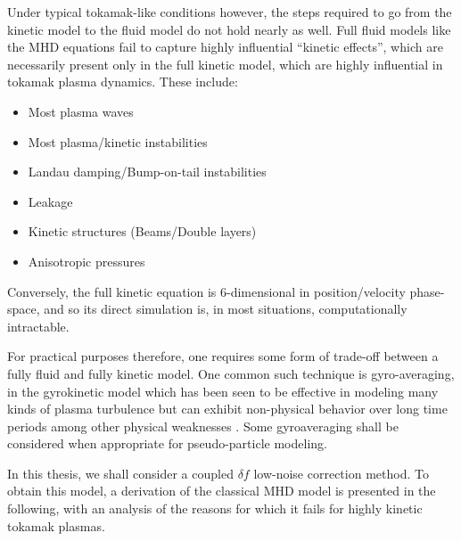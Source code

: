     Under typical tokamak-like conditions however, the steps required to go from the kinetic model to the fluid model do not hold nearly as well. Full fluid models like the MHD equations fail to capture highly influential ``kinetic effects'', which are necessarily present only in the full kinetic model, which are highly influential in tokamak plasma dynamics. These include:
    \begin{itemize}
        \item  Most plasma waves \BA{[Ref]}
        \item  Most plasma/kinetic instabilities \BA{[Ref]}
        \item  Landau damping/Bump-on-tail instabilities \BA{[Ref]}
        \item  Leakage \BA{[Ref]}
        \item  Kinetic structures (Beams/Double layers) \BA{[Ref]}
        \item  Anisotropic pressures \BA{[Ref]}
    \end{itemize}
    Conversely, the full kinetic equation is 6-dimensional in position/velocity phase-space, and so its direct simulation is, in most situations, computationally intractable.

    For practical purposes therefore, one requires some form of trade-off between a fully fluid and fully kinetic model. One common such technique is gyro-averaging, in the gyrokinetic model \cite{Howes_et_al_2006, Parra_Barnes_Peters_2011, Abel_et_al_2013} which has been seen to be effective in modeling many kinds of plasma turbulence \cite{McKee_et_al_2001} but can exhibit non-physical behavior over long time periods \BA{[Ref]} among other physical weaknesses \BA{[Ref]}. Some gyroaveraging shall be considered when appropriate for pseudo-particle modeling. 
    
    In this thesis, we shall consider a coupled $\delta\!f$ low-noise correction method. To obtain this model, a derivation of the classical MHD model is presented in the following, with an analysis of the reasons for which it fails for highly kinetic tokamak plasmas.

    
    
    
    
